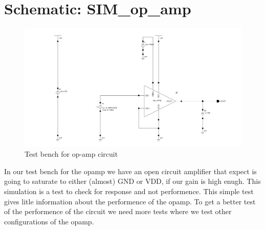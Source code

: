 \documentclass[english, a4paper,11pt]{article}
\begin{document}
\section*{Schematic: SIM\_op\_amp}
\begin{figure}[!ht]
 \centering
   \includegraphics[width=\textwidth]{img/SIM_op_amp.png}
   \caption{Test bench for op-amp circuit}
   \label{sim:opamp}
\end{figure}
In our test bench for the opamp we have an open circuit amplifier that expect is going to saturate to either (almost) GND or VDD, if our gain is high enugh.
This simulation is a test to check for response and not performence.
This simple test gives litle information about the performence of the opamp. 
To get a better test of the performence of the circuit we need more tests where we test other configurations of the opamp. 


\end{document}
